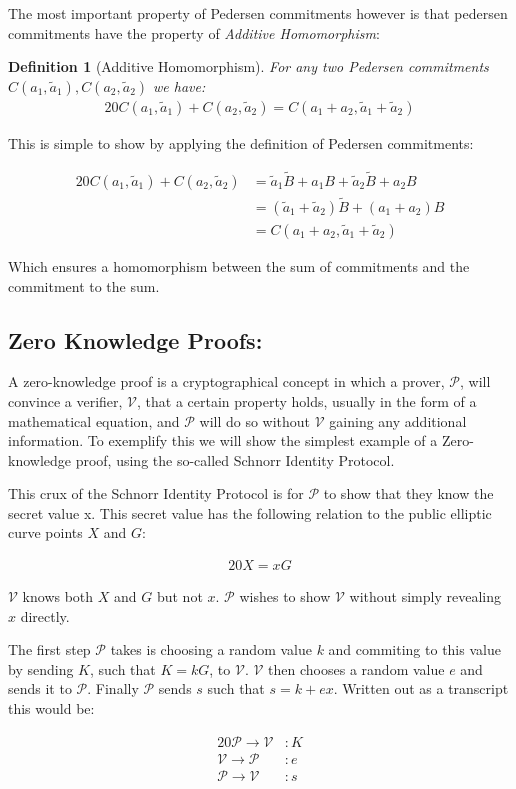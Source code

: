 \documentclass{article}
\newtheorem{definition}{Definition}[section]
\newcommand{\eq}[1]{\begin{alignat*}{20}#1\end{alignat*}}
\newcommand{\V}{\mathcal{V}}
\renewcommand{\P}{\mathcal{P}}
\newcommand{\tB}{\widetilde{B}}
\newcommand{\ba}{\widetilde{a}}
\begin{document}
The most important property of Pedersen commitments however is
that pedersen commitments have the property of \textit{Additive
Homomorphism}:

\begin{definition}[Additive Homomorphism] \label{pedersen-additive-homomorphism}
	For any two Pedersen commitments $C(a_1,\ba_1), C(a_2,\ba_2)$ we have:
	\eq{
		C(a_1,\ba_1) + C(a_2,\ba_2) = C(a_1 + a_2, \ba_1 + \ba_2)
	}
\end{definition}

This is simple to show by applying the definition of Pedersen
commitments: 

\eq{
	C(a_1,\ba_1) + C(a_2,\ba_2) &= \ba_1\tB + a_1B  + \ba_2\tB + a_2B \\
	                            &= (\ba_1 + \ba_2)\tB + (a_1 + a_2)B \\
	                            &= C(a_1 + a_2, \ba_1 + \ba_2)
}

Which ensures a homomorphism between the sum of commitments and the
commitment to the sum.

\subsection{Zero Knowledge Proofs:}\label{zero-knowledge}

A zero-knowledge proof is a cryptographical concept in which a prover,
$\P$, will convince a verifier, $\V$, that a certain property holds,
usually in the form of a mathematical equation, and $\P$ will do so
without $\V$ gaining any additional information. To exemplify this we
will show the simplest example of a Zero-knowledge proof, using the
so-called Schnorr Identity Protocol.

This crux of the Schnorr Identity Protocol is for $\P$ to show that
they know the secret value x. This secret value has the following
relation to the public elliptic curve points $X$ and $G$:

\eq{
	X = xG
}

$\V$ knows both $X$ and $G$ but not $x$. $\P$ wishes to show $\V$
without simply revealing $x$ directly.

The first step $\P$ takes is choosing a random value $k$ and commiting
to this value by sending $K$, such that $K = kG$, to $\V$. $\V$ then
chooses a random value $e$ and sends it to $\P$. Finally $\P$ sends $s$
such that $s = k + ex$. Written out as a transcript this would be:

\eq{
	\P \rightarrow \V &: K \\
	\V \rightarrow \P &: e \\
	\P \rightarrow \V &: s \\
}
\end{document}

